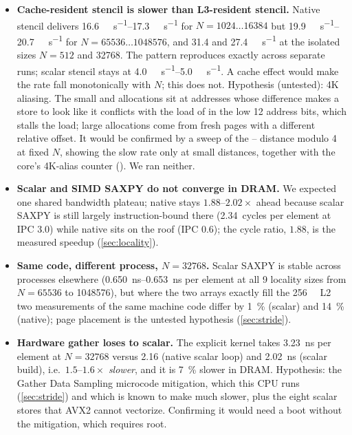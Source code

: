 \begin{itemize}
        \qtyrange{4.0}{5.0}{\giga\flop\per\second} at every size (\qty{4.0}{\giga\flop\per\second},
        \SI{37}{\percent} of the roof, in DRAM). The retained
        ratio is again scalar's instruction cost, as for SAXPY (\cref{sec:locality}), just larger.
  \item \textbf{Cache-resident stencil is slower than L3-resident stencil.} Native stencil delivers
        \qtyrange{16.6}{17.3}{\giga\flop\per\second} for $N=\num{1024}\ldots\num{16384}$ but
        \qtyrange{19.9}{20.7}{\giga\flop\per\second} for $N=\num{65536}\ldots\num{1048576}$, and
        \num{31.4} and \qty{27.4}{\giga\flop\per\second} at the isolated sizes $N=512$ and
        \num{32768}. The pattern reproduces exactly across separate runs; scalar stencil stays at \qtyrange{4.0}{5.0}{\giga\flop\per\second}. A cache
        effect would make the rate fall monotonically with $N$; this does not. Hypothesis (untested): 4K aliasing. The small  and 
        allocations sit at addresses whose difference makes a store to  look like it
        conflicts with the load of  in the low 12 address bits, which stalls the load;
        large allocations come from fresh pages with a different relative offset. It would be confirmed by a
        sweep of the -- distance modulo \qty{4}{\kibi\byte} at fixed $N$, showing
        the slow rate only at small distances, together with the core's 4K-alias counter
        (). We ran neither.
  \item \textbf{Scalar and SIMD SAXPY do not converge in DRAM.} We expected one shared bandwidth
        plateau; native stays $1.88\text{--}2.02\times$ ahead because scalar SAXPY is still largely
        instruction-bound there (\num{2.34}~cycles per element at IPC \num{3.0}) while native sits on
        the roof (IPC \num{0.6}); the cycle ratio, $1.88$, is the measured speedup
        (\cref{sec:locality}).
  \item \textbf{Same code, different process, $N=\num{32768}$.} Scalar SAXPY is stable across
        processes elsewhere (\qtyrange{0.650}{0.653}{\nano\second} per element at all \num{9}
        locality sizes from $N=\num{65536}$ to \num{1048576}), but where the two arrays exactly fill
        the \qty{256}{\kibi\byte} L2 two measurements of the same machine code differ by
        \SI{1}{\percent} (scalar) and \SI{14}{\percent} (native); page placement is the untested
        hypothesis (\cref{sec:stride}).
  \item \textbf{Hardware gather loses to scalar.} The explicit  kernel takes
        \qty{3.23}{\nano\second} per element at $N=\num{32768}$ versus \num{2.16} (native scalar
        loop) and \qty{2.02}{\nano\second} (scalar build), i.e.\ $1.5\text{--}1.6\times$
        \emph{slower}, and it is \SI{7}{\percent} slower in DRAM. Hypothesis: the Gather Data
        Sampling microcode mitigation, which this CPU runs (\cref{sec:stride}) and which is known
        to make  much slower, plus the eight scalar
        stores that AVX2 cannot vectorize. Confirming it would need a boot without the mitigation,
        which requires root.
\end{itemize}

